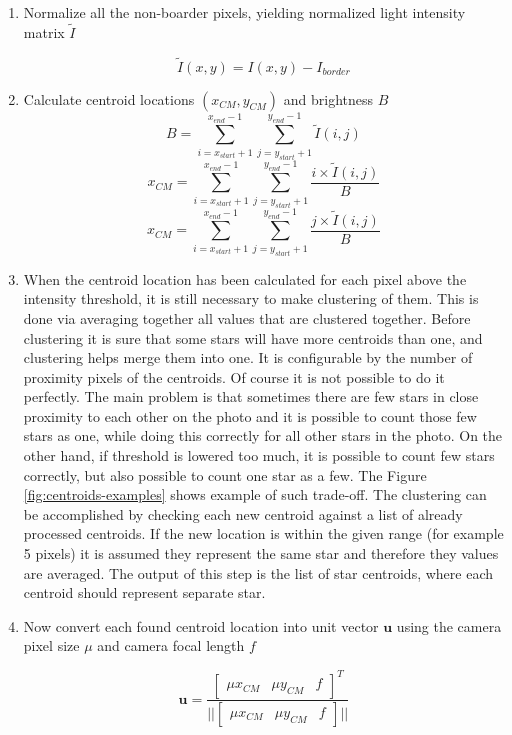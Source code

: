 \documentclass[12pt,a4paper,oneside]{article}
\begin{document}
\begin{enumerate}
\item Normalize all the non-boarder pixels, yielding normalized light intensity matrix $\tilde{I}$

\begin{equation}
\tilde{I}(x,y) = I(x,y) - I_{border}
\end{equation}

\item Calculate centroid locations $(x_{CM}, y_{CM})$ and brightness $B$
\begin{equation}
B = \sum_{i=x_{start}+1}^{x_{end}-1}\sum_{j=y_{start}+1}^{y_{end}-1}\tilde{I}(i,j)
\end{equation}
\begin{equation}
x_{CM} = \sum_{i=x_{start}+1}^{x_{end}-1}\sum_{j=y_{start}+1}^{y_{end}-1}\frac{i \times \tilde{I}(i,j)}{B}
\end{equation}
\begin{equation}
x_{CM} = \sum_{i=x_{start}+1}^{x_{end}-1}\sum_{j=y_{start}+1}^{y_{end}-1}\frac{j \times \tilde{I}(i,j)}{B}
\end{equation}

\item When the centroid location has been calculated for each pixel above the intensity threshold, it is still necessary to make clustering of them. This is done via averaging together all values that are clustered together. Before clustering it is sure that some stars will have more centroids than one, and clustering helps merge them into one. It is configurable by the number of proximity pixels of the centroids. Of course it is not possible to do it perfectly. The main problem is that sometimes there are few stars in close proximity to each other on the photo and it is possible to count those few stars as one, while doing this correctly for all other stars in the photo. On the other hand, if threshold is lowered too much, it is possible to count few stars correctly, but also possible to count one star as a few. The Figure \ref{fig:centroids-examples} shows example of such trade-off.
The clustering can be accomplished by checking each new centroid against a list of already processed centroids. If the new location is within the given range (for example 5 pixels) it is assumed they represent the same star and therefore they values are averaged. The output of this step is the list of star centroids, where each centroid should represent separate star.


\item Now convert each found centroid location into unit vector $\bm{u}$ using the camera pixel size $\mu$ and camera focal length $f$

\begin{equation}
\bm{u} = \frac{
\begin{bmatrix}
\mu x_{CM} & \mu y_{CM} & f
\end{bmatrix}
^T}
{||
\begin{bmatrix}
\mu x_{CM} & \mu y_{CM} & f
\end{bmatrix}
||}
\end{equation}
\end{enumerate}
\end{document}
